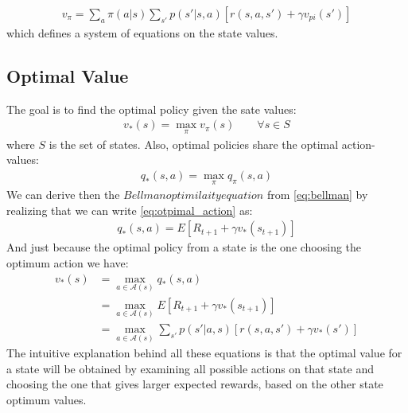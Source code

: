 \documentclass{article}
\begin{document}
\begin{align}
v_{\pi} =  \sum_{a}\pi(a|s) \sum_{s'} p(s' | s,a) \left[ r(s,a,s') + \gamma v_{pi}(s') \right]
\end{align}
which defines a system of equations on the state values.

\subsection{Optimal Value}
The goal is to find the optimal policy given the sate values:
\begin{align}
    v_*(s) = \max_\pi v_\pi (s) \qquad \forall s \in S
\end{align}
where $S$ is the set of states. Also, optimal policies share the optimal action-values:
\begin{align}
    q_*(s,a) = \max_\pi q_\pi (s, a)
    \label{eq:optimal_action}
\end{align}
We can derive then the $Bellman optimilaity equation$ from \eqref{eq:bellman} by realizing that we can write \eqref{eq:otpimal_action} as:
\begin{align}
    q_*(s,a) = E\left[R_{t+1} + \gamma v_*(s_{t+1})\right]
\end{align}
And just because the optimal policy from a state is the one choosing the optimum action we have:
\begin{align}
    v_*(s) &= \max_{a \in \mathcal{A}(s)} q_*(s,a) \\
    &= \max_{a \in \mathcal{A}(s)} E\left[R_{t+1} + \gamma v_*(s_{t+1})\right] \\
    &= \max_{a \in \mathcal{A}(s)} \sum_{s'} p(s'|a,s)\left[r(s,a,s') + \gamma v_*(s')\right]
\end{align}
The intuitive explanation behind all these equations is that the optimal value for a state will be obtained by examining all possible actions on that state and choosing the one that gives larger expected rewards, based on the other state optimum values.
\end{document}
